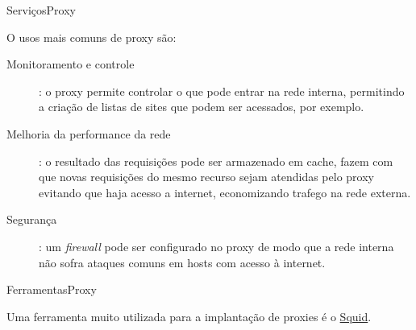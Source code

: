 \begin{frame}{Serviços}{Proxy}

O usos mais comuns de proxy são:

\begin{description}
\item[Monitoramento e controle]: o proxy permite controlar o que pode
    entrar na rede interna, permitindo a criação de listas de sites
    que podem ser acessados, por exemplo.

\item[Melhoria da performance da rede]: o resultado das requisições
    pode ser armazenado em cache, fazem com que novas requisições do
    mesmo recurso sejam atendidas pelo proxy evitando que haja acesso
    a internet, economizando trafego na rede externa.

\item[Segurança]: um {\it firewall\/} pode ser configurado no proxy de modo que
a rede interna não sofra ataques comuns em hosts com acesso à
internet.
\end{description}

\end{frame}

\begin{frame}{Ferramentas}{Proxy}

Uma ferramenta muito utilizada para a implantação de proxies é o
\href{http://www.squid-cache.org/}{Squid}.

\end{frame}